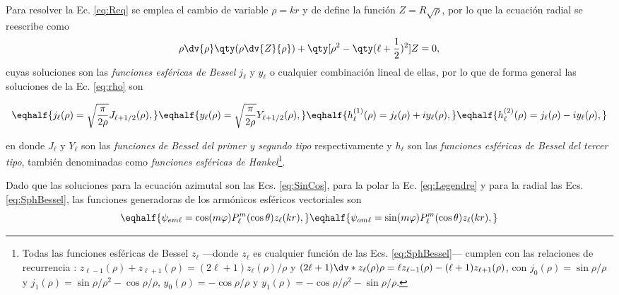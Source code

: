 Para resolver la Ec. \eqref{eq:Req} se emplea el cambio de variable $\rho = k r$ y de define la función $Z =R\sqrt{\rho}$, por lo que la ecuación radial se reescribe como 
	\begin{align}
	\rho \dv{\rho}\qty(\rho\dv{Z}{\rho})+\qty[\rho^2-\qty(\ell+\frac12)^2] Z = 0,
	\label{eq:rho}
	\end{align}
cuyas soluciones son las \emph{funciones esféricas de Bessel} $j_\ell$ y $y_\ell$ o cualquier combinación lineal de ellas, por lo que de forma general las soluciones de la Ec. \eqref{eq:rho} son \cite{arfken2001methods} 

	\begin{subequations}
	\eqhalf{j_\ell (\rho) = \sqrt{\frac{\pi}{2\rho}} J_{\ell+1/2}(\rho), \label{eqs:jn}}
	\eqhalf{y_\ell (\rho) = \sqrt{\frac{\pi}{2\rho}} Y_{\ell+1/2}(\rho), \label{eqs:yn}}
	\eqhalf{h_\ell^{(1)} (\rho) = j_\ell(\rho) + i y_\ell(\rho), \label{eqs:h1}}
	\eqhalf{h_\ell^{(2)} (\rho) =  j_\ell(\rho) - i y_\ell(\rho), \label{eqs:h2}}
	\label{eq:SphBessel}
	\end{subequations}

\noindent	
en donde $J_\ell$ y $Y_\ell$ son las \emph{funciones de Bessel del primer y segundo tipo} respectivamente y $h_\ell$ son las \emph{funciones esféricas de Bessel del tercer tipo}, también denominadas como \emph{funciones esféricas de Hankel}\footnote{Todas las funciones esféricas de Bessel $z_\ell$ ---donde $z_\ell$ es cualquier función de las Ecs. \eqref{eq:SphBessel}--- cumplen con las  relaciones de recurrencia \cite{arfken2001methods}: $	z_{\ell-1}(\rho) + z_{\ell+1}(\rho) =(2\ell+1)z_\ell(\rho)/\rho$ y $(2\ell + 1) \dv*{z_\ell(\rho)}{\rho} = \ell z_{\ell-1}(\rho) - (\ell+1)z_{\ell+1}(\rho)$, con  $j_0(\rho) = \sin\rho / \rho$ y $j_1(\rho) = \sin\rho / \rho^2- \cos\rho/\rho$, $y_0(\rho) = -\cos\rho/\rho$ y $y_1(\rho) = -\cos\rho/\rho^2-\sin\rho/\rho$.}.

Dado que las soluciones para la ecuación azimutal son las Ecs. \eqref{eq:SinCos}, para la polar la Ec. \eqref{eq:Legendre} y para la radial las Ecs. \eqref{eq:SphBessel}, las funciones generadoras de los armónicos esféricos vectoriales son\begin{subequations}\vspace*{-2em}

	\eqhalf{\psi_{em\ell} = \cos(m\varphi) P_\ell^m( \cos \theta) z_\ell(k r),}
	\eqhalf{\psi_{om\ell} = \sin(m\varphi) P_\ell^m( \cos \theta) z_\ell(k r),}
	\label{eq:psieo}	\end{subequations}\vspace*{-1em}

